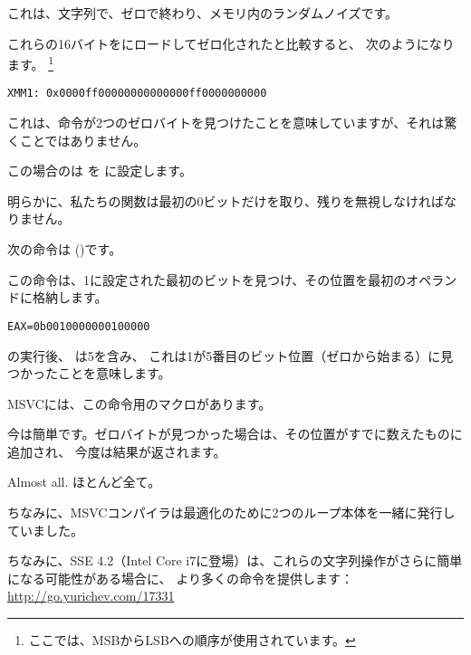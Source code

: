 これは、文字列で、ゼロで終わり、メモリ内のランダムノイズです。

これらの16バイトをにロードしてゼロ化されたと比較すると、
次のようになります。
\footnote{ここでは、\ac{MSB}から\ac{LSB}への順序が使用されています。}

\begin{verbatim}
XMM1: 0x0000ff00000000000000ff0000000000
\end{verbatim}

これは、命令が2つのゼロバイトを見つけたことを意味していますが、それは驚くことではありません。
 
この場合のは \EAX を
に設定します。

明らかに、私たちの関数は最初の0ビットだけを取り、残りを無視しなければなりません。

\label{instruction_BSF}
次の命令は ()です。

この命令は、1に設定された最初のビットを見つけ、その位置を最初のオペランドに格納します。

\begin{verbatim}
EAX=0b0010000000100000
\end{verbatim}

の実行後、 \EAX は5を含み、
これは1が5番目のビット位置（ゼロから始まる）に見つかったことを意味します。

MSVCには、この命令用のマクロがあります。

今は簡単です。ゼロバイトが見つかった場合は、その位置がすでに数えたものに追加され、
今度は結果が返されます。

Almost all.
ほとんど全て。

ちなみに、MSVCコンパイラは最適化のために2つのループ本体を一緒に発行していました。

ちなみに、SSE 4.2（Intel Core i7に登場）は、これらの文字列操作がさらに簡単になる可能性がある場合に、
より多くの命令を提供します：\url{http://go.yurichev.com/17331}
